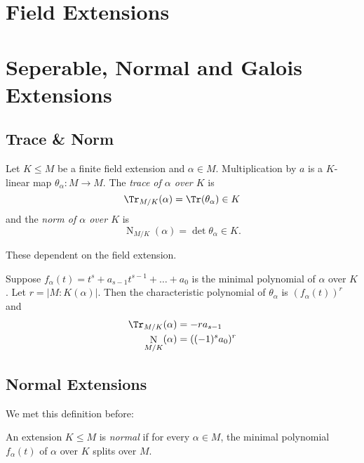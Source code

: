 \documentclass[a4paper]{article}
\DeclareMathOperator{\n}{N}
\begin{document}


\tableofcontents

\section{Field Extensions}


\section{Seperable, Normal and Galois Extensions}

\blindtext

\subsection{Trace \& Norm}

\begin{definition}
  Let \(K \leq M\) be a finite field extension and \(\alpha \in M\). Multiplication by \(a\) is a \(K\)-linear map \(\theta_\alpha: M \to M\). The \emph{trace of \(\alpha\) over \(K\)} is
  \[
    \Tr_{M/K}(\alpha) = \Tr( \theta_\alpha) \in K
  \]
  and the \emph{norm of \(\alpha\) over \(K\)} is
  \[
    \n_{M/K}(\alpha) = \det \theta_\alpha \in K.
  \]
\end{definition}

\begin{note}
  These dependent on the field extension.
\end{note}

\begin{theorem}
  Suppose \(f_\alpha(t) = t^s + a_{s - 1}t^{s - 1} + \dots + a_0\) is the minimal polynomial of \(\alpha\) over \(K\). Let \(r = |M: K(\alpha)|\). Then the characteristic polynomial of \(\theta_\alpha\) is \((f_\alpha(t))^r\) and
  \begin{align*}
    \Tr_{M/K}(\alpha) &= -r a_{s-1} \\
    \n_{M/K}(\alpha) &= ((-1)^s a_0)^r
  \end{align*}
\end{theorem}

\subsection{Normal Extensions}

We met this definition before:

\begin{definition}
  An extension \(K \leq M\) is \emph{normal} if for every \(\alpha \in M\), the minimal polynomial \(f_\alpha(t)\) of \(\alpha\) over \(K\) splits over \(M\).
\end{definition}
\end{document}
